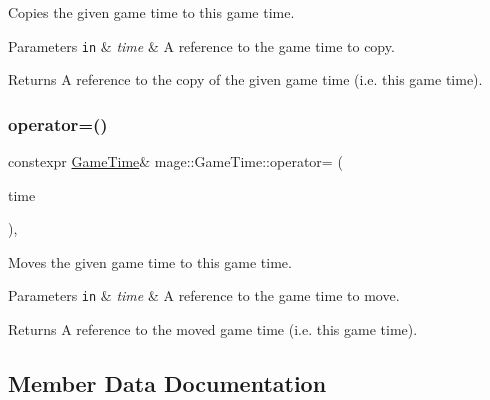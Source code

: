 Copies the given game time to this game time.


\begin{DoxyParams}[1]{Parameters}
\mbox{\tt in}  & {\em time} & A reference to the game time to copy. \\
\hline
\end{DoxyParams}
\begin{DoxyReturn}{Returns}
A reference to the copy of the given game time (i.\+e. this game time). 
\end{DoxyReturn}
\mbox{\label{classmage_1_1_game_time_a79756019f21b5125114483ddc71247fe}} 
\subsubsection{\texorpdfstring{operator=()}{operator=()}\hspace{0.1cm}{\footnotesize\ttfamily [2/2]}}
{\footnotesize\ttfamily constexpr \mbox{\hyperlink{classmage_1_1_game_time}{Game\+Time}}\& mage\+::\+Game\+Time\+::operator= (\begin{DoxyParamCaption}\item[{\mbox{\hyperlink{classmage_1_1_game_time}{Game\+Time}} \&\&}]{time }\end{DoxyParamCaption})\hspace{0.3cm}{\ttfamily [default]}, {\ttfamily [noexcept]}}

Moves the given game time to this game time.


\begin{DoxyParams}[1]{Parameters}
\mbox{\tt in}  & {\em time} & A reference to the game time to move. \\
\hline
\end{DoxyParams}
\begin{DoxyReturn}{Returns}
A reference to the moved game time (i.\+e. this game time). 
\end{DoxyReturn}


\subsection{Member Data Documentation}
\mbox{\label{classmage_1_1_game_time_a2c48f0162e4ac75edb0124a22432a1f2}} 
